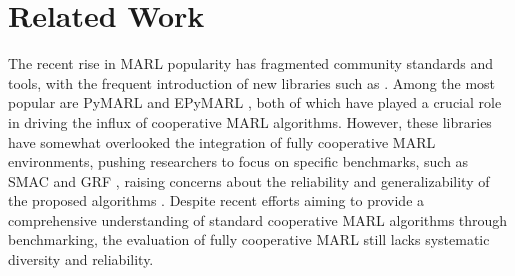 \section{Related Work}
The recent rise in MARL popularity has fragmented community standards and tools, with the frequent introduction of new libraries such as \cite{rutherford2024jaxmarl, hu2022marllib, liang2018rllib, pettingzoo}. Among the most popular are PyMARL \cite{smac} and EPyMARL \cite{papoudakis2021benchmarking}, both of which have played a crucial role in driving the influx of cooperative MARL algorithms. However, these libraries have somewhat overlooked the integration of fully cooperative MARL environments, pushing researchers to focus on specific benchmarks, such as SMAC \cite{smac, smac2} and GRF \cite{grf}, raising concerns about the reliability and generalizability of the proposed algorithms \cite{protocol}. Despite recent efforts \cite{papoudakis2021benchmarking, yu2020benchmarking, bettini2024benchmarl, hu2022marllib} aiming to provide a comprehensive understanding of standard cooperative MARL algorithms through benchmarking, the evaluation of fully cooperative MARL still lacks systematic diversity and reliability.